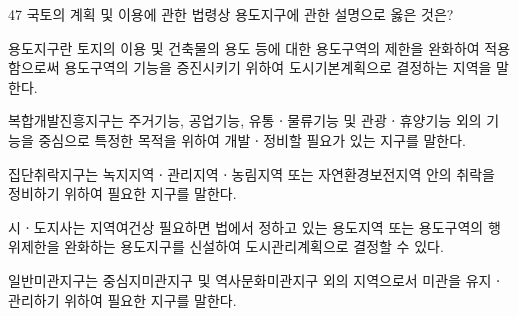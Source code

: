 \begin{question}{47}
국토의 계획 및 이용에 관한 법령상 용도지구에 관한 설명으로 옳은 것은?
\begin{choices}
  \item 용도지구란 토지의 이용 및 건축물의 용도 등에 대한 용도구역의 제한을 완화하여 적용함으로써 용도구역의 기능을 증진시키기 위하여 도시기본계획으로 결정하는 지역을 말한다.
  \item 복합개발진흥지구는 주거기능, 공업기능, 유통ㆍ물류기능 및 관광ㆍ휴양기능 외의 기능을 중심으로 특정한 목적을 위하여 개발ㆍ정비할 필요가 있는 지구를 말한다.
  \item 집단취락지구는 녹지지역ㆍ관리지역ㆍ농림지역 또는 자연환경보전지역 안의 취락을 정비하기 위하여 필요한 지구를 말한다.
  \item 시ㆍ도지사는 지역여건상 필요하면 법에서 정하고 있는 용도지역 또는 용도구역의 행위제한을 완화하는 용도지구를 신설하여 도시관리계획으로 결정할 수 있다.
  \item 일반미관지구는 중심지미관지구 및 역사문화미관지구 외의 지역으로서 미관을 유지ㆍ관리하기 위하여 필요한 지구를 말한다.
\end{choices}
\end{question}
